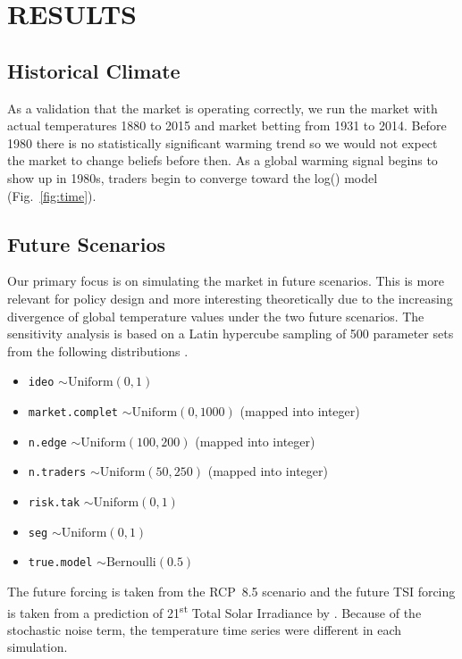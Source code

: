\documentclass{wscpaperproc}\usepackage[]{graphicx}\usepackage[]{color}
\begin{document}
\section{RESULTS}

\subsection{Historical Climate}

As a validation that the market is operating correctly, we run the market with actual temperatures 1880 to 2015 and market betting from 1931 to 2014. Before 1980 there is no statistically significant warming trend so we would not expect the market to change beliefs before then. As a global warming signal begins to show up in 1980s, traders begin to converge toward the log() model (Fig.~\ref{fig:time}).

\subsection{Future Scenarios}



Our primary focus is on simulating the market in future scenarios. This is more relevant for policy design and more interesting theoretically due to the increasing divergence of global temperature values under the two future scenarios. The sensitivity analysis is based on a Latin hypercube sampling of 500 parameter sets from the following distributions .

\begin{itemize}
  \item \texttt{ideo} $\sim \text{Uniform}(0,1)$
  \item \texttt{market.complet} $\sim \text{Uniform}(0,1000)$ (mapped into integer)
  \item \texttt{n.edge} $\sim \text{Uniform}(100,200)$ (mapped into integer)
  \item \texttt{n.traders} $\sim \text{Uniform}(50,250)$ (mapped into integer)
  \item \texttt{risk.tak}  $\sim \text{Uniform}(0,1)$
  \item \texttt{seg} $\sim \text{Uniform}(0,1)$
  \item \texttt{true.model} $\sim \text{Bernoulli}(0.5)$
\end{itemize}

The future  forcing is taken from the RCP~8.5 scenario  and the future TSI forcing is taken from a prediction of 21\textsuperscript{st} Total Solar Irradiance by . Because of the stochastic noise term, the temperature time series were different in each simulation.
\end{document}
